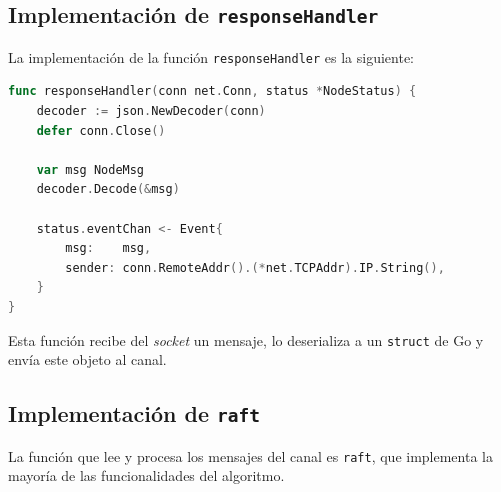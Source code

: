 \subsection{Implementación de \texttt{responseHandler}}

La implementación de la función \texttt{responseHandler} es la siguiente:

\begin{lstlisting}[language=go]
func responseHandler(conn net.Conn, status *NodeStatus) {
	decoder := json.NewDecoder(conn)
	defer conn.Close()

	var msg NodeMsg
	decoder.Decode(&msg)
	
	status.eventChan <- Event{
		msg:    msg,
		sender: conn.RemoteAddr().(*net.TCPAddr).IP.String(),
	}
}
\end{lstlisting}

Esta función recibe del \textit{socket} un mensaje, lo deserializa a un \texttt{struct} de Go \cite{gostructs} y envía este objeto al canal.

\subsection{Implementación de \texttt{raft}}

La función que lee y procesa los mensajes del canal es \texttt{raft}, que implementa la mayoría de las funcionalidades del algoritmo.

